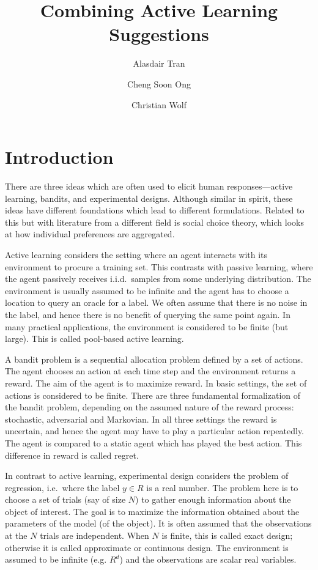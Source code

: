 \documentclass[fleqn,10pt,lineno]{wlpeerj} %
\title{Combining Active Learning Suggestions}
\author[1]{Alasdair Tran}
\author[2]{Cheng Soon Ong}
\author[3]{Christian Wolf}
\affil[1]{Computational Media Lab, Australian National University}
\affil[2]{Machine Learning Research Group, Data61, CSIRO, Australia}
\affil[3]{Research School of Astronomy and Astrophysics, Australian National
          University}
\begin{document}
\flushbottom
\maketitle
\thispagestyle{empty}

\section*{Introduction}

There are three ideas which are often used to elicit human responses---active
learning, bandits, and experimental designs. Although similar in spirit, these
ideas have different foundations which lead to different formulations. Related
to this but with literature from a different field is social choice theory,
which looks at how individual preferences are aggregated.

Active learning considers the setting where an agent interacts with its
environment to procure a training set. This contrasts with passive learning,
where the agent passively receives i.i.d.\, samples from some underlying
distribution. The environment is usually assumed to be infinite and the agent
has to choose a location to query an oracle for a label. We often assume
that there is no noise in the label, and hence there is no benefit of querying
the same point again. In many practical applications, the environment is
considered to be finite (but large). This is called pool-based active
learning.

A bandit problem is a sequential allocation problem defined by a set of
actions. The agent chooses an action at each time step and the environment
returns a reward. The aim of the agent is to maximize reward. In basic
settings, the set of actions is considered to be finite. There are three
fundamental formalization of the bandit problem, depending on the assumed
nature of the reward process: stochastic, adversarial and Markovian. In all
three settings the reward is uncertain, and hence the agent may have to play a
particular action repeatedly. The agent is compared to a static agent which has
played the best action. This difference in reward is called regret.

In contrast to active learning, experimental design considers the problem of
regression, i.e.\, where the label $y\in R$ is a real number. The problem here
is to choose a set of trials (say of size $N$) to gather enough information
about the object of interest. The goal is to maximize the information obtained
about the parameters of the model (of the object). It is often assumed that the
observations at the $N$ trials are independent. When $N$ is finite, this is
called exact design; otherwise it is called approximate or continuous design.
The environment is assumed to be infinite (e.g. $R^d$) and the observations are
scalar real variables.
\end{document}
